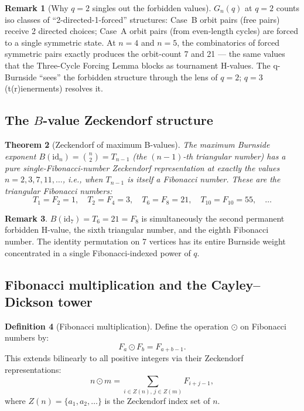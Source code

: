 \documentclass[12pt,reqno]{amsart}
\newtheorem{theorem}{Theorem}[section]
\theoremstyle{definition}
\newtheorem{definition}[theorem]{Definition}
\newtheorem{remark}[theorem]{Remark}
\theoremstyle{plain}
\begin{document}
\begin{remark}[Why $q=2$ singles out the forbidden values]
$G_n(q)$ at $q=2$ counts iso classes of ``2-directed-1-forced'' structures:
Case~B orbit pairs (free pairs) receive 2 directed choices; Case~A orbit
pairs (from even-length cycles) are forced to a single symmetric state.
At $n=4$ and $n=5$, the combinatorics of forced symmetric pairs exactly
produces the orbit-count 7 and 21 --- the same values that the
Three-Cycle Forcing Lemma blocks as tournament H-values.
The q-Burnside ``sees'' the forbidden structure through the lens of
$q=2$; $q=3$ (t(r)ienerments) resolves it.
\end{remark}

\subsection{The \texorpdfstring{$B$}{B}-value Zeckendorf structure}

\begin{theorem}[Zeckendorf of maximum B-values]\label{thm:B-zeck}
The maximum Burnside exponent $B(\mathrm{id}_n)=\binom{n}{2}=T_{n-1}$ (the
$(n-1)$-th triangular number) has a pure single-Fibonacci-number
Zeckendorf representation at exactly the values $n=2,3,7,11,\ldots$,
i.e., when $T_{n-1}$ is itself a Fibonacci number.  These are the
\emph{triangular Fibonacci numbers}:
\[
  T_1=F_2=1,\quad T_2=F_4=3,\quad T_6=F_8=21,\quad T_{10}=F_{10}=55,\quad\ldots
\]
\end{theorem}

\begin{remark}
$B(\mathrm{id}_7)=T_6=21=F_8$ is simultaneously the second permanent
forbidden H-value, the sixth triangular number, and the eighth Fibonacci number.
The identity permutation on 7 vertices has its entire Burnside weight
concentrated in a single Fibonacci-indexed power of $q$.
\end{remark}

\subsection{Fibonacci multiplication and the Cayley--Dickson tower}
\label{ssec:fib-mult}

\begin{definition}[Fibonacci multiplication]
Define the operation $\odot$ on Fibonacci numbers by:
\[
  F_a\odot F_b=F_{a+b-1}.
\]
This extends bilinearly to all positive integers via their Zeckendorf
representations:
\[
  n\odot m=\sum_{i\in Z(n),\,j\in Z(m)}F_{i+j-1},
\]
where $Z(n)=\{a_1,a_2,\ldots\}$ is the Zeckendorf index set of $n$.
\end{definition}
\end{document}
